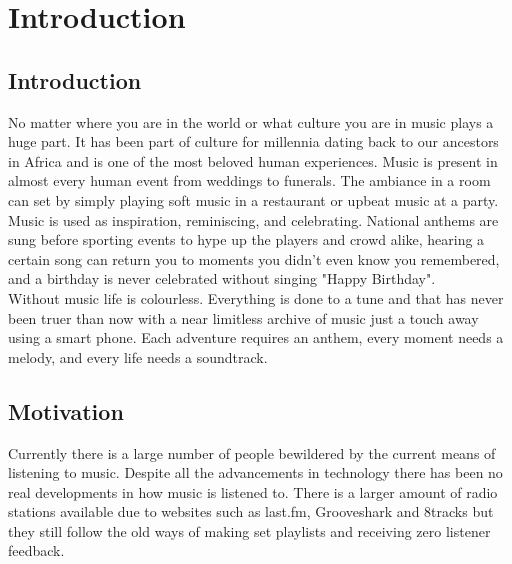 \documentclass[a4paper, 12pt]{report}
\begin{document}
\tableofcontents
\clearpage

\chapter{Introduction}

\section{Introduction}
No matter where you are in the world or what culture you are in music plays a huge part. It has been part of culture for millennia dating back to our ancestors in Africa and is one of the most beloved human experiences. Music is present in almost every human event from weddings to funerals. The ambiance in a room can set by simply playing soft music in a restaurant or upbeat music at a party. \\

Music is used as inspiration, reminiscing, and celebrating. National anthems are sung before sporting events to hype up the players and crowd alike, hearing a certain song can return you to moments you didn’t even know you remembered, and a birthday is never celebrated without singing "Happy Birthday".  \\

Without music life is colourless. Everything is done to a tune and that has never been truer than now with a near limitless archive of music just a touch away using a smart phone. Each adventure requires an anthem, every moment needs a melody, and every life needs a soundtrack. \\%



\section{Motivation}
Currently there is a large number of people bewildered by the current means of listening to music. Despite all the advancements in technology there has been no real developments in how music is listened to. There is a larger amount of radio stations available due to websites such as last.fm, Grooveshark and 8tracks but they still follow the old ways of making set playlists and receiving zero listener feedback. \\
\end{document}
